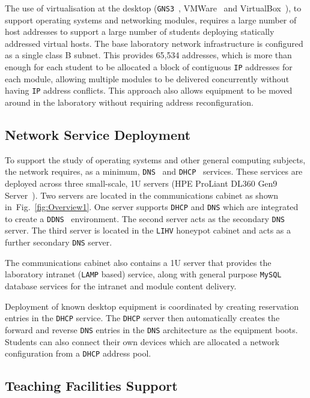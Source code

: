 \documentclass[10pt,journal]{IEEEtran}
\begin{document}
The use of virtualisation at the desktop (\texttt{GNS3}~\cite{GNS3:17},
VMWare~\cite{VMWARE:17} and VirtualBox~\cite{O:17}), to support operating
systems and networking modules, requires a large number of host addresses to
support a large number of students deploying statically addressed virtual
hosts. The base laboratory network infrastructure is configured as a single
class B subnet.  This provides 65,534 addresses, which is more than enough for
each student to be allocated a block of contiguous \texttt{IP} addresses for
each module, allowing multiple modules to be delivered concurrently without
having \texttt{IP} address conflicts.  This approach also allows equipment to
be moved around in the laboratory without requiring address reconfiguration.

\subsection{Network Service Deployment}\label{InfraService}

To support the study of operating systems and other general computing subjects,
the network requires, as a minimum, \texttt{DNS}~\cite{RA:11} and
\texttt{DHCP}~\cite{DL:02} services. These services are deployed across three
small-scale, 1U servers (HPE ProLiant DL360 Gen9 Server~\cite{HPE:17}). Two
servers are located in the communications cabinet as shown
in~Fig.~\ref{fig:Overview1}. One server supports \texttt{DHCP} and \texttt{DNS}
which are integrated to create a \texttt{DDNS}~\cite{SV:06} environment. The
second server acts as the secondary \texttt{DNS} server. The third server is
located in the \texttt{LIHV} honeypot cabinet and acts as a further secondary
\texttt{DNS} server.

The communications cabinet also contains a 1U server that provides the
laboratory intranet (\texttt{LAMP} based) service, along with general purpose
\texttt{MySQL} database services for the intranet and module content delivery.

Deployment of known desktop equipment is coordinated by creating reservation
entries in the \texttt{DHCP} service. The \texttt{DHCP} server then
automatically creates the forward and reverse \texttt{DNS} entries in the
\texttt{DNS} architecture as the equipment boots. Students can also connect
their own devices which are allocated a network configuration from a
\texttt{DHCP} address pool.

\subsection{Teaching Facilities Support}
\end{document}
